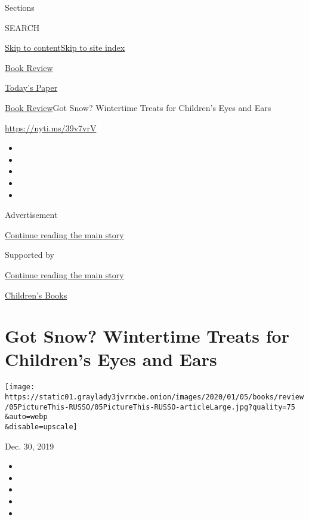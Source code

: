 Sections

SEARCH

\protect\hyperlink{site-content}{Skip to
content}\protect\hyperlink{site-index}{Skip to site index}

\href{https://www.nytimes3xbfgragh.onion/section/books/review}{Book
Review}

\href{https://myaccount.nytimes3xbfgragh.onion/auth/login?response_type=cookie\&client_id=vi}{}

\href{https://www.nytimes3xbfgragh.onion/section/todayspaper}{Today's
Paper}

\href{/section/books/review}{Book Review}\textbar{}Got Snow? Wintertime
Treats for Children's Eyes and Ears

\url{https://nyti.ms/39v7vrV}

\begin{itemize}
\item
\item
\item
\item
\item
\end{itemize}

Advertisement

\protect\hyperlink{after-top}{Continue reading the main story}

Supported by

\protect\hyperlink{after-sponsor}{Continue reading the main story}

\href{/column/childrens-books}{Children's Books}

\hypertarget{got-snow-wintertime-treats-for-childrens-eyes-and-ears}{%
\section{Got Snow? Wintertime Treats for Children's Eyes and
Ears}\label{got-snow-wintertime-treats-for-childrens-eyes-and-ears}}

\texttt{[image: https://static01.graylady3jvrrxbe.onion/images/2020/01/05/books/review/05PictureThis-RUSSO/05PictureThis-RUSSO-articleLarge.jpg?quality=75\\\&auto=webp\\\&disable=upscale]}

Dec. 30, 2019

\begin{itemize}
\item
\item
\item
\item
\item
\end{itemize}

